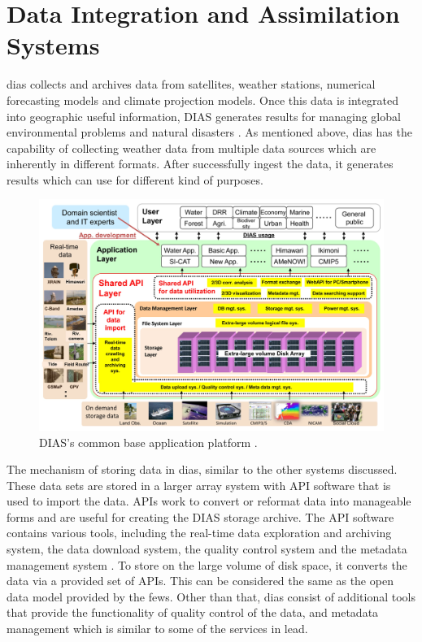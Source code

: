 \section{Data Integration and Assimilation Systems}
\label{se:dias}

\acrfull{dias} \cite{Kawasaki2018DataReduction} collects and archives data from satellites, weather stations, numerical forecasting models and climate projection models. Once this data is integrated into geographic useful information, DIAS generates results for managing global environmental problems and natural disasters \cite{Kawasaki2018DataReduction}. As mentioned above, \acrshort{dias} has the capability of collecting weather data from multiple data sources which are inherently in different formats. After successfully ingest the data, it generates results which can use for different kind of purposes.

\begin{figure}[htp]
    \centering
    \includegraphics[width=1\textwidth]{lit/other/dias_common_base_application_platform.jpg}
    \caption[DIAS’s common base application platform.]{DIAS’s common base application platform \cite{Kawasaki2018DataReduction}.}
    \label{fi:dias_common_platform}
\end{figure}

The mechanism of storing data in \acrshort{dias}, similar to the other systems discussed.
These data sets are stored in a larger array system with API software that is used to import the data. APIs work to convert or reformat data into manageable forms and are useful for creating the DIAS storage archive. The API software contains various tools, including the real-time data exploration and archiving system, the data download system, the quality control system and the metadata management system \cite{Kawasaki2018DataReduction}. To store on the large volume of disk space, it converts the data via a provided set of APIs. This can be considered the same as the open data model provided by the \acrshort{fews}. Other than that, \acrshort{dias} consist of additional tools that provide the functionality of quality control of the data, and metadata management which is similar to some of the services in \acrshort{lead}.


